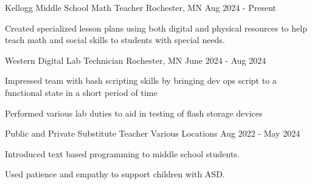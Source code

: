 

\begin{cventries}
  \cventry
    {Kellogg Middle School} %
    {Math Teacher} %
    {Rochester, MN} %
    {Aug 2024 - Present} %
    {
      \begin{cvitems} %
        \item {Created specialized lesson plans using both digital and physical resources to help teach math and social skills to students with special needs.}
      \end{cvitems}
    }
  \cventry
    {Western Digital} %
    {Lab Technician} %
    {Rochester, MN} %
    {June 2024 - Aug 2024} %
    {
      \begin{cvitems} %
        \item {Impressed team with bash scripting skills by bringing dev ops script to a functional state in a short period of time}
        \item {Performed various lab duties to aid in testing of flash storage devices}
      \end{cvitems}
    }

  \cventry
    {Public and Private} %
    {Substitute Teacher} %
    {Various Locations} %
    {Aug 2022 - May 2024} %
    {
      \begin{cvitems} %
        \item {Introduced text based programming to middle school students.}
        \item {Used patience and empathy to support children with ASD.}
      \end{cvitems}
    }



\end{cventries}
